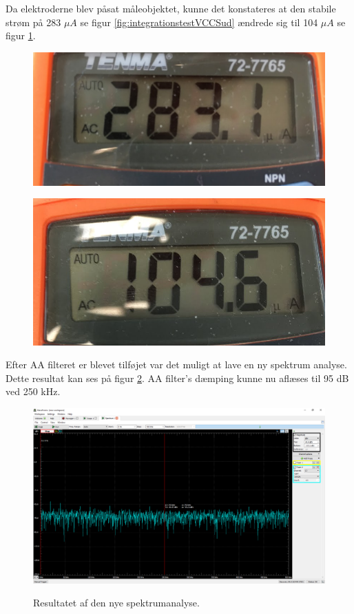 Da elektroderne blev påsat måleobjektet, kunne det konstateres at den stabile strøm på 283 $\mu A$ se figur \ref{fig:integrationstestVCCSud} ændrede sig til 104 $\mu A$ se figur \ref{fig:integrationstestINA2udstrom}.

\begin{figure}[H]
\centering
\begin{minipage}{.5\textwidth}
  \centering
  \includegraphics[width=.6\linewidth]{Figure/integrationstestVCCSud}
  \label{fig:integrationstestVCCSud}
\end{minipage}%
\begin{minipage}{.5\textwidth}
  \centering
  \includegraphics[width=.6\linewidth]{Figure/integrationstestINA2udstrom}
  \label{fig:integrationstestINA2udstrom}
\end{minipage}
\end{figure}

Efter AA filteret er blevet tilføjet var det muligt at lave en ny spektrum analyse. Dette resultat kan ses på figur \ref{fig:integrationstestAAspectrum}. AA filter's dæmping kunne nu aflæses til 95 dB ved 250 kHz.

\begin{figure}[H] 
\centering
{\includegraphics[width=\linewidth]
{Figure/integrationstestAAspectrum}}
\caption{Resultatet af den nye spektrumanalyse.}
\label{fig:integrationstestAAspectrum}
\end{figure}



